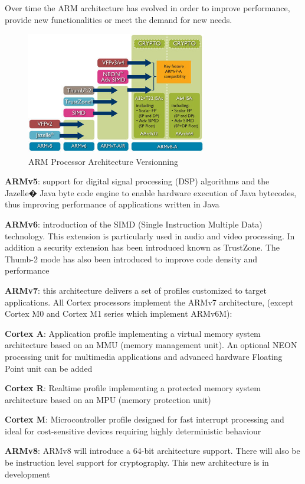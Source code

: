 \documentclass[pdftex,10pt,a4paper]{report}
\newenvironment{packed_item}{
\begin{itemize}
  \setlength{\itemsep}{1pt}
  \setlength{\parskip}{0pt}
  \setlength{\parsep}{0pt}
}{\end{itemize}}
\begin{document}
Over time the ARM architecture has evolved in order to improve performance, provide new functionalities or meet the demand for new needs.

\begin{figure}[h!]
\centering
\includegraphics[width=0.7\textwidth]{./arm_arch.jpg}
\caption{ARM Processor Architecture Versionning}
\label{ARM Processor Architecture Versionning}
\end{figure}

\begin{packed_item}
	\item \textbf{ARMv5}: support for digital signal processing (DSP) algorithms and the Jazelle� Java byte code engine to enable hardware execution of Java bytecodes, thus improving performance of applications written in Java
	\item \textbf{ARMv6}: introduction of the SIMD (Single Instruction Multiple Data) technology. This extension is particularly used in audio and video processing. In addition a security extension has been introduced known as TrustZone. The Thumb-2 mode has also been introduced to improve code density and performance
	\item \textbf{ARMv7}: this architecture delivers a set of profiles customized to target applications. All Cortex processors implement the ARMv7 architecture, (except Cortex M0 and Cortex M1 series which implement ARMv6M):
	\begin{packed_item}
		\item \textbf{Cortex A}: Application profile implementing a virtual memory system architecture based on an MMU (memory management unit). An optional NEON processing unit for multimedia applications and advanced hardware Floating Point unit can be added
		\item \textbf{Cortex R}: Realtime profile implementing a protected memory system architecture based on an MPU (memory protection unit)
		\item \textbf{Cortex M}: Microcontroller profile designed for fast interrupt processing and ideal for cost-sensitive devices requiring highly deterministic behaviour
	\end{packed_item}
	\item \textbf{ARMv8}: ARMv8 will introduce a 64-bit architecture support. There will also be be instruction level support for cryptography. This new architecture is in development
\end{packed_item}
\end{document}
